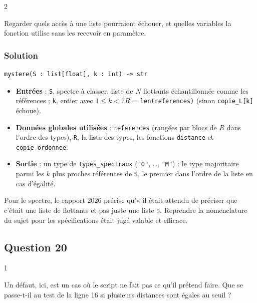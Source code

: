 \documentclass[11pt,a4paper]{article}
\providecommand{\tightlist}{\setlength{\itemsep}{0pt}\setlength{\parskip}{0pt}}
\begin{document}
\begin{indication}{2}

Regarder quels accès à une liste pourraient échouer, et quelles variables la fonction utilise sans les recevoir en paramètre.

\end{indication}

\hypertarget{solution-18}{%
\subsubsection{Solution}\label{solution-18}}

\begin{lstlisting}
mystere(S : list[float], k : int) -> str
\end{lstlisting}

\begin{itemize}
\tightlist
\item
  \textbf{Entrées} : \texttt{S}, spectre à classer, liste de \(N\) flottants échantillonnée comme les références ; \texttt{k}, entier avec \(1 \leqslant k < 7R\) = \texttt{len(references)} (sinon \texttt{copie\_L{[}k{]}} échoue).
\item
  \textbf{Données globales utilisées} : \texttt{references} (rangées par blocs de \(R\) dans l'ordre des types), \texttt{R}, la liste des types, les fonctions \texttt{distance} et \texttt{copie\_ordonnee}.
\item
  \textbf{Sortie} : un type de \texttt{types\_spectraux} (\texttt{"O"}, \ldots, \texttt{"M"}) : le type majoritaire parmi les \(k\) plus proches références de \texttt{S}, le premier dans l'ordre de la liste en cas d'égalité.
\end{itemize}

\begin{jury}

Pour le spectre, le rapport 2026 précise qu'« il était attendu de préciser que c'était une liste de flottants et pas juste une liste ». Reprendre la nomenclature du sujet pour les spécifications était jugé valable et efficace.

\end{jury}

\hypertarget{question-20}{%
\subsection{Question 20}\label{question-20}}

\begin{indication}{1}

Un défaut, ici, est un cas où le script ne fait pas ce qu'il prétend faire. Que se passe-t-il au test de la ligne 16 si plusieurs distances sont égales au seuil ?

\end{indication}
\end{document}
